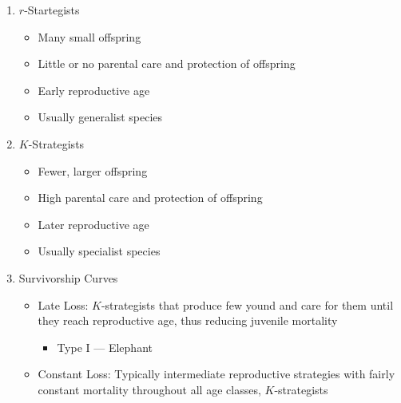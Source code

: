 \documentclass[12pt]{article}
\begin{document}
\begin{enumerate}
  \item $r$-Startegists

    \begin{itemize}

      \item Many small offspring

      \item Little or no parental care and protection of offspring

      \item Early reproductive age

      \item Usually generalist species

    \end{itemize}

  \item $K$-Strategists

    \begin{itemize}

      \item Fewer, larger offspring

      \item High parental care and protection of offspring

      \item Later reproductive age

      \item Usually specialist species

    \end{itemize}

  \item Survivorship Curves

    \begin{itemize}

      \item Late Loss: $K$-strategists that produce few yound and care for them until they reach reproductive age, thus reducing juvenile mortality

        \begin{itemize}

          \item Type I — Elephant
            
        \end{itemize}

      \item Constant Loss: Typically intermediate reproductive strategies with fairly constant mortality throughout all age classes, $K$-strategists


\end{itemize}
\end{enumerate}
\end{document}
